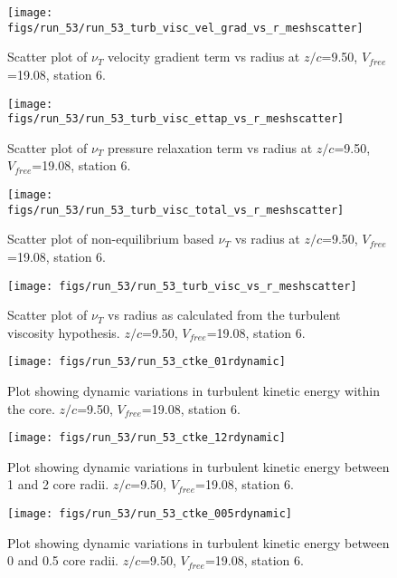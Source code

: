 \begin{figure}[H]
\centering
\texttt{[image: figs/run\_53/run\_53\_turb\_visc\_vel\_grad\_vs\_r\_meshscatter]}
\caption{Scatter plot of $\nu_T$ velocity gradient term vs radius at $z/c$=9.50, $V_{free}$=19.08, station 6.}
\end{figure}


\begin{figure}[H]
\centering
\texttt{[image: figs/run\_53/run\_53\_turb\_visc\_ettap\_vs\_r\_meshscatter]}
\caption{Scatter plot of $\nu_T$ pressure relaxation term vs radius at $z/c$=9.50, $V_{free}$=19.08, station 6.}
\end{figure}


\begin{figure}[H]
\centering
\texttt{[image: figs/run\_53/run\_53\_turb\_visc\_total\_vs\_r\_meshscatter]}
\caption{Scatter plot of non-equilibrium based $\nu_T$ vs radius at $z/c$=9.50, $V_{free}$=19.08, station 6.}
\end{figure}


\begin{figure}[H]
\centering
\texttt{[image: figs/run\_53/run\_53\_turb\_visc\_vs\_r\_meshscatter]}
\caption{Scatter plot of $\nu_T$ vs radius as calculated from the turbulent viscosity hypothesis. $z/c$=9.50, $V_{free}$=19.08, station 6.}
\end{figure}


\begin{figure}[H]
\centering
\texttt{[image: figs/run\_53/run\_53\_ctke\_01rdynamic]}
\caption{Plot showing dynamic variations in turbulent kinetic energy within the core. $z/c$=9.50, $V_{free}$=19.08, station 6.}
\end{figure}


\begin{figure}[H]
\centering
\texttt{[image: figs/run\_53/run\_53\_ctke\_12rdynamic]}
\caption{Plot showing dynamic variations in turbulent kinetic energy between 1 and 2 core radii. $z/c$=9.50, $V_{free}$=19.08, station 6.}
\end{figure}


\begin{figure}[H]
\centering
\texttt{[image: figs/run\_53/run\_53\_ctke\_005rdynamic]}
\caption{Plot showing dynamic variations in turbulent kinetic energy between 0 and 0.5 core radii. $z/c$=9.50, $V_{free}$=19.08, station 6.}
\end{figure}


